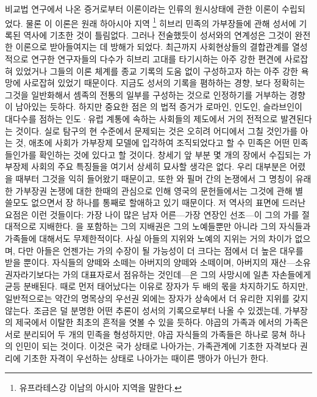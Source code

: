 비교법 연구에서 나온 증거로부터
 이론이라는
인류의 원시상태에 관한 이론이 수립되었다.
물론 이 이론은 원래 하아시아 지역%
\footnote{유프라테스강 이남의 아시아 지역을 말한다.}
히브리 민족의 가부장들에 관해 성서에 기록된 역사에 기초한 것이 틀림없다.
그러나 전술했듯이 성서와의 연계성은 그것이 완전한 이론으로
받아들여지는 데 방해가 되었다.
최근까지 사회현상들의 결합관계를 열성적으로 연구한 연구자들의 다수가
히브리 고대를 타기시하는 아주 강한 편견에 사로잡혀 있었거나
그들의 이론 체계를
종교 기록의 도움 없이
구성하고자 하는
아주 강한 욕망에 사로잡혀 있었기 때문이다.
지금도 성서의 기록을 폄하하는 경향,
보다 정확히는 그것을 일반화해서
셈족의 전통의 일부를 구성하는 것으로 인정하기를 거부하는
경향이 남아있는 듯하다.
하지만 중요한 점은 의 법적 증거가
로마인, 인도인, 슬라브인이 대다수를 점하는
인도·유럽 계통에 속하는 사회들의 제도에서 거의 전적으로 발견된다는 것이다.
실로 탐구의 현 수준에서 문제되는 것은 오히려 어디에서 그칠 것인가를 아는 것,
애초에 사회가 가부장제 모델에 입각하여 조직되었다고 할 수 
민족은 어떤 민족들인가를 확인하는 것에 있다고 할 것이다.
창세기 앞 부분 몇 개의 장에서 수집되는 가부장제 사회의 주요 특징들을
여기서 상세히 묘사할 생각은 없다.
우리 대부분은 어렸을 때부터 그것을 익히 들어왔기 때문이고, 또한
와 필머 간의 논쟁에서 그 명칭이 유래한 가부장권 논쟁에 대한
한때의 관심으로 인해
영국의 문헌들에서는
그것에 관해
별 쓸모도 없으면서
장 하나를 통째로 할애하고 있기 때문이다.
저 역사의 표면에 드러난 요점은 이런 것들이다:
가장 나이 많은 남자 어른---가장 연장인 선조---이 그의 가를
절대적으로 지배한다.
을 포함하는 그의 지배권은 그의 노예들뿐만 아니라
그의 자식들과 가족들에 대해서도 무제한적이다.
사실 아들의 지위와 노예의 지위는 거의 차이가 없으며,
다만 아들은 언젠가는 가의 수장이 될 가능성이 더 크다는 점에서 더 높은 대우를
받을 뿐이다.
자식들의 양떼와 소떼는 아버지의 양떼와 소떼이며,
아버지의 재산---소유권자라기보다는 가의 대표자로서 점유하는 것인데---은
그의 사망시에 일촌 자손들에게 균등 분배된다.
때로 먼저 태어났다는 이유로 장자가 두 배의 몫을 차지하기도 하지만,
일반적으로는 약간의 명목상의 우선권 외에는 장자가 상속에서 더 유리한
지위를 갖지 않는다.
조금은 덜 분명한 어떤 추론이 성서의 기록으로부터 나올 수 있겠는데,
가부장의 제국에서 이탈한 최초의 흔적을 엿볼 수 있을 듯하다.
야곱의 가족과 에서의 가족은 서로 분리되어 두 개의 민족을 형성하지만,
야곱 자식들의 가족들은 하나로 뭉쳐 하나의 인민이 되는 것이다.
이것은 국가 상태로 나아가는,
가족관계에 기초한 자격보다 권리에 기초한 자격이 우선하는 상태로 나아가는
때이른 맹아가 아닌가 한다.

